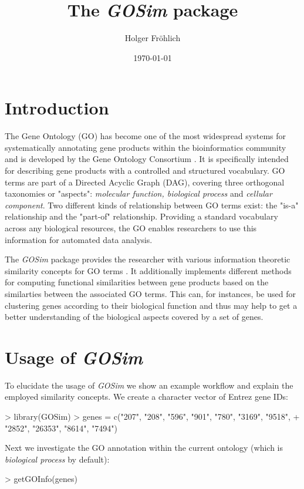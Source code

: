 \documentclass[12pt,a4paper]{article}
\begin{document}
\author{Holger Fr\"ohlich}

\title{The \emph{GOSim} package}
\date{\today}
\maketitle

\section{Introduction}

The Gene Ontology (GO) has become one of the most widespread systems for systematically annotating gene products within the bioinformatics community and is developed by the Gene Ontology Consortium \cite{GOConsortium04}. It is specifically intended for describing gene products with a controlled and structured vocabulary. GO terms are part of a Directed Acyclic Graph (DAG), covering three orthogonal taxonomies or "aspects": \emph{molecular function, biological process} and \emph{cellular component}. Two different kinds of relationship between GO terms exist: the "is-a" relationship and the "part-of" relationship.
Providing a standard vocabulary across any biological resources, the GO enables researchers to use this information for automated data analysis.

The \emph{GOSim} package provides the researcher with various information theoretic similarity concepts for GO terms \cite{Resnik95, Resnik99, Lin98, Jiang98, Lord03, Couto2003FuSSiMeg, Couto2005GraSM}. It additionally implements different methods for computing functional similarities between gene products based on the similarties between the associated GO terms. This can, for instances, be used for clustering genes according to their biological function \cite{FroeGO05, FroeSpeerGOKer06} and thus may help to get a better understanding of the biological aspects covered by a set of genes.

\section{Usage of \emph{GOSim}}

To elucidate the usage of \emph{GOSim} we show an example workflow and explain the employed similarity concepts. We create  a character vector of Entrez gene IDs:
\begin{Schunk}
\begin{Sinput}
> library(GOSim)
> genes = c("207", "208", "596", "901", "780", "3169", "9518", 
+     "2852", "26353", "8614", "7494")
\end{Sinput}
\end{Schunk}
Next we investigate the GO annotation within the current ontology (which is \emph{biological process} by default):
\begin{Schunk}
\begin{Sinput}
> getGOInfo(genes)
\end{Sinput}
\end{Schunk}
\end{document}

